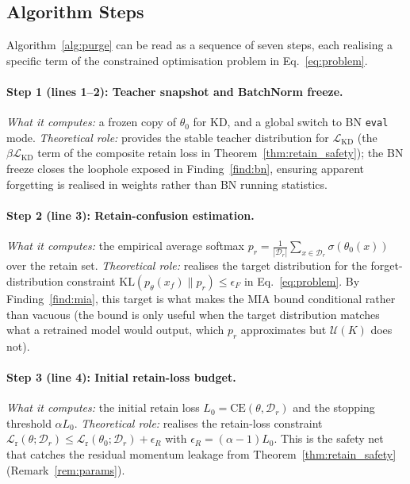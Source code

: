 \documentclass{article}
\newcommand{\KL}{\mathrm{KL}}
\newcommand{\CE}{\mathrm{CE}}
\newcommand{\Dr}{\mathcal{D}_r}
\newcommand{\lossr}{\mathcal{L}_{\mathrm{r}}}
\newcommand{\losskd}{\mathcal{L}_{\mathrm{KD}}}
\newcommand{\new}[1]{{\color{orange}#1}}
\begin{document}
\new{
\subsection{Algorithm Steps}\label{sec:alg_steps}

Algorithm~\ref{alg:purge} can be read as a sequence of seven steps, each realising a specific term of the constrained optimisation problem in Eq.~\ref{eq:problem}.

\paragraph{Step 1 (lines 1--2): Teacher snapshot and BatchNorm freeze.}
\emph{What it computes:} a frozen copy of $\theta_0$ for KD, and a global switch to BN \texttt{eval} mode.
\emph{Theoretical role:} provides the stable teacher distribution for $\losskd$ (the $\beta\losskd$ term of the composite retain loss in Theorem~\ref{thm:retain_safety}); the BN freeze closes the loophole exposed in Finding~\ref{find:bn}, ensuring apparent forgetting is realised in weights rather than BN running statistics.

\paragraph{Step 2 (line 3): Retain-confusion estimation.}
\emph{What it computes:} the empirical average softmax $p_r = \tfrac{1}{|\Dr|}\sum_{x\in\Dr}\sigma(\theta_0(x))$ over the retain set.
\emph{Theoretical role:} realises the target distribution for the forget-distribution constraint $\KL(p_\theta(x_f)\|p_r) \le \epsilon_F$ in Eq.~\ref{eq:problem}. By Finding~\ref{find:mia}, this target is what makes the MIA bound conditional rather than vacuous (the bound is only useful when the target distribution matches what a retrained model would output, which $p_r$ approximates but $\mathcal{U}(K)$ does not).

\paragraph{Step 3 (line 4): Initial retain-loss budget.}
\emph{What it computes:} the initial retain loss $L_0 = \CE(\theta, \Dr)$ and the stopping threshold $\alpha L_0$.
\emph{Theoretical role:} realises the retain-loss constraint $\lossr(\theta;\Dr) \le \lossr(\theta_0;\Dr) + \epsilon_R$ with $\epsilon_R = (\alpha - 1)L_0$. This is the safety net that catches the residual momentum leakage from Theorem~\ref{thm:retain_safety} (Remark~\ref{rem:params}).

}
\end{document}
